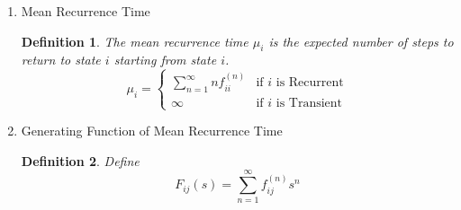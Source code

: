 \documentclass{article}
\newtheorem{definition}{Definition}[section]
\begin{document}
\begin{enumerate}
\begin{proof}
          Let $C = A - B$.
          Then, for all $\alpha \in C$, $I_{\alpha}$ is Recurrent.

          We then prove that $I_{\alpha}$ is Closed for all $\alpha \in C$.,
          which finished the proof of this theorem.

          If $I_{\alpha}$ is not closed,
          then there exists $i \in I_{\alpha}$ and $j \notin I_{\alpha}$,
          and $n \in \mathbb{N}$
          such that $P_{ij}^{(n)} > 0$.

          Also, as $i \in I_{\alpha}$, $i$ is Recurrent, and thus
          \begin{equation}
            f_{ii} = 1
          \end{equation}

          Also, in this case, $j$ can not Communicate with $i$,
          as if it does, $j$ will be in $I_{\alpha}$,
          which means
          \begin{equation}
            f_{ji} = 0
          \end{equation}

          Then we have
          \begin{eqnarray*}
            1 &=& f_{ii} \\
            &=& \sum_{k\in I} P_{ik}^{(n)} f_{ki} \\
            &=& P_{ij}^{(n)}*f_{ji} + \sum_{k\in I, k\neq j} P_{ik}^{(n)} f_{ki} \\
            &=& \sum_{k\in I, k\neq j} P_{ik}^{(n)} f_{ki} \\
            &\le& \sum_{k\in I, k\neq j} P_{ik}^{(n)} \\
            &=& 1- P_{ij}^{(n)} \\
            &<& 1
          \end{eqnarray*}

          This is a contradiction. Thus, $I_{\alpha}$ is closed.
        \end{proof}
  \item Mean Recurrence Time
        \begin{definition}
          The mean recurrence time $\mu_{i}$ is the expected number of steps to return to state
          $i$ starting from state $i$.
          \begin{equation}
            \mu_{i} = \begin{cases}
              \sum_{n=1}^{\infty} n f^{(n)}_{ii} & \text{if } i \text{ is Recurrent} \\
              \infty                             & \text{if } i \text{ is Transient}
            \end{cases}
          \end{equation}
        \end{definition}
  \item Generating Function of Mean Recurrence Time
        \begin{definition}
          Define
          \begin{equation}
            F_{ij}(s) = \sum_{n=1}^{\infty} f_{ij}^{(n)} s^{n}
          \end{equation}


\end{definition}
\end{enumerate}
\end{document}
